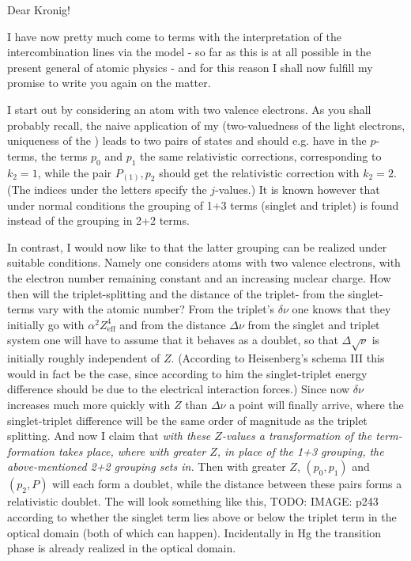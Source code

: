 \date{October 9, 1925}

Dear Kronig!

I have now pretty much come to terms with the interpretation of the intercombination lines via the model - so far as this is at all possible in the present general  of atomic physics - and for this reason I shall now fulfill my promise to write you again on the matter.

I start out by considering an atom with two valence electrons. As you shall probably recall, the naive application of my  (two-valuedness of the light electrons, uniqueness of the ) leads to two pairs of states and should e.g. have in the $p$-terms, the terms $p_0$ and $p_1$ the same relativistic corrections, corresponding to $k_2=1$, while the pair $P_{(1)}, p_2$ should get the relativistic correction with $k_2=2$. (The indices under the letters specify the $j$-values.) It is known however that under normal conditions the grouping of 1+3 terms (singlet and triplet) is found instead of the grouping in 2+2 terms.

In contrast, I would now like to  that the latter grouping can be realized under suitable conditions. Namely one considers  atoms with two valence electrons, with the electron number remaining constant and an increasing nuclear charge. How then will the triplet-splitting and the distance of the triplet- from the singlet-terms vary with the atomic number? From the triplet's $\delta\nu$ one knows that they initially go with $\alpha^2 Z^4_{\text{eff}}$ and from the distance $\Delta\nu$ from the singlet and triplet system one will have to assume that it behaves as a  doublet, so that $\Delta\sqrt{\nu}$ is initially roughly independent of $Z$. (According to Heisenberg's schema III this would in fact be the case, since according to him the singlet-triplet energy difference should be due to the electrical interaction forces.) Since now $\delta\nu$ increases much more quickly with $Z$ than $\Delta\nu$ a point will finally arrive, where the singlet-triplet difference will be the same order of magnitude as the triplet splitting. And now I claim that \textit{with these $Z$-values a transformation of the term-formation takes place, where with greater $Z$, in place of the 1+3 grouping, the above-mentioned 2+2 grouping sets in.} Then with greater $Z$, $(p_0, p_1)$ and $(p_2, P)$ will each form a  doublet, while the distance between these pairs forms a relativistic doublet. The  will look something like this,
TODO: IMAGE: p243
according to whether the singlet term lies above or below the triplet term in the optical domain (both of which can happen). Incidentally in Hg the transition phase is already realized in the optical domain.


